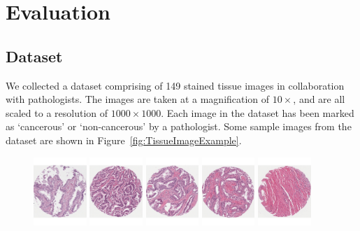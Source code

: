 \section{Evaluation}
\label{sec:evaluation}

\subsection{Dataset}
We collected a dataset comprising of 149 stained tissue images in collaboration with pathologists. The images are taken at a magnification of $10\times$, and are all scaled to a resolution of $1000\times 1000$. Each image in the dataset has been marked as `cancerous' or `non-cancerous' by a pathologist. Some sample images from the dataset are shown in Figure~\ref{fig:TissueImageExample}.

\begin{figure}
\includegraphics[width=2.0cm]{figs/145_green.pdf}
\includegraphics[width=2.0cm]{figs/93_red.pdf}
\includegraphics[width=2.0cm]{figs/130_green.pdf}
\includegraphics[width=2.0cm]{figs/87_red.pdf}
\includegraphics[width=2.0cm]{figs/63_green.pdf}

\end{figure}
